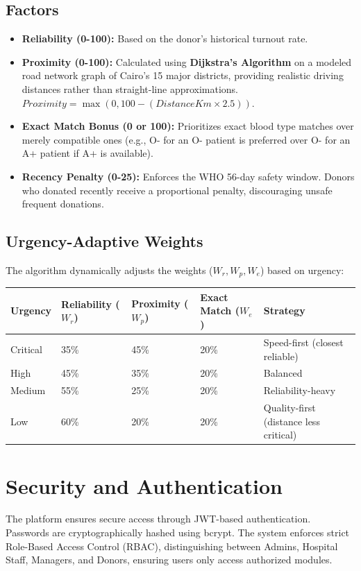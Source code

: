 \documentclass[12pt,a4paper]{article}
\begin{document}
\subsection{Factors}
\begin{itemize}
    \item \textbf{Reliability (0-100):} Based on the donor's historical turnout rate.
    \item \textbf{Proximity (0-100):} Calculated using \textbf{Dijkstra's Algorithm} on a modeled road network graph of Cairo's 15 major districts, providing realistic driving distances rather than straight-line approximations. $Proximity = \max(0, 100 - (DistanceKm \times 2.5))$.
    \item \textbf{Exact Match Bonus (0 or 100):} Prioritizes exact blood type matches over merely compatible ones (e.g., O- for an O- patient is preferred over O- for an A+ patient if A+ is available).
    \item \textbf{Recency Penalty (0-25):} Enforces the WHO 56-day safety window. Donors who donated recently receive a proportional penalty, discouraging unsafe frequent donations.
\end{itemize}

\subsection{Urgency-Adaptive Weights}
The algorithm dynamically adjusts the weights ($W_r, W_p, W_e$) based on urgency:
\begin{table}[H]
\centering
\begin{tabular}{@{}lllll@{}}
\toprule
\textbf{Urgency} & \textbf{Reliability ($W_r$)} & \textbf{Proximity ($W_p$)} & \textbf{Exact Match ($W_e$)} & \textbf{Strategy} \\ \midrule
Critical & 35\% & 45\% & 20\% & Speed-first (closest reliable) \\
High & 45\% & 35\% & 20\% & Balanced \\
Medium & 55\% & 25\% & 20\% & Reliability-heavy \\
Low & 60\% & 20\% & 20\% & Quality-first (distance less critical) \\ \bottomrule
\end{tabular}
\end{table}

\section{Security and Authentication}
The platform ensures secure access through JWT-based authentication. Passwords are cryptographically hashed using bcrypt. The system enforces strict Role-Based Access Control (RBAC), distinguishing between Admins, Hospital Staff, Managers, and Donors, ensuring users only access authorized modules.
\end{document}

